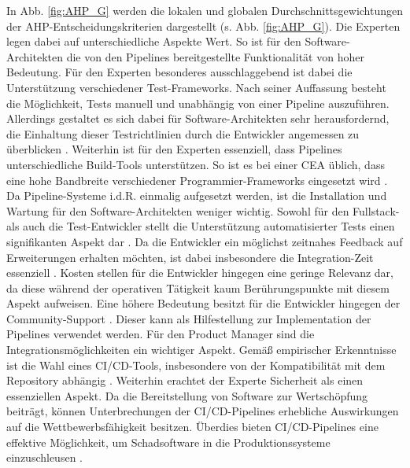 In Abb. \ref*{fig:AHP_G} werden die lokalen und globalen Durchschnittsgewichtungen der AHP-Entscheidungskriterien dargestellt (s. Abb. \ref{fig:AHP_G}). Die Experten legen dabei auf unterschiedliche Aspekte Wert. So ist für den Software-Architekten die von den Pipelines bereitgestellte Funktionalität von hoher Bedeutung. Für den Experten besonderes ausschlaggebend ist dabei die Unterstützung verschiedener Test-Frameworks. Nach seiner Auffassung besteht die Möglichkeit, Tests manuell und unabhängig von einer Pipeline auszuführen. Allerdings gestaltet es sich dabei für Software-Architekten sehr herausfordernd, die Einhaltung dieser Testrichtlinien durch die Entwickler angemessen zu überblicken \cite[Z. 16]{SoftwareArchitektSAPDTSIntegration.}. Weiterhin ist für den Experten essenziell, dass Pipelines unterschiedliche Build-Tools unterstützen. So ist es bei einer CEA üblich, dass eine hohe Bandbreite verschiedener Programmier-Frameworks eingesetzt wird \cite[Z. 11]{SoftwareArchitektSAPDTSIntegration.}. Da Pipeline-Systeme i.d.R. einmalig aufgesetzt werden, ist die Installation und Wartung für den Software-Architekten weniger wichtig. Sowohl für den Fullstack- als auch die Test-Entwickler stellt die Unterstützung automatisierter Tests einen signifikanten Aspekt dar \cite[Z. 4]{BackendTestDeveloperSAPDTSIntegration.}. Da die Entwickler ein möglichst zeitnahes Feedback auf Erweiterungen erhalten möchten, ist dabei insbesondere die Integration-Zeit essenziell \cite[Z. 21]{TestDeveloperSAPHyperspaceAdoption&Onboarding.b}. Kosten stellen für die Entwickler hingegen eine geringe Relevanz dar, da diese während der operativen Tätigkeit kaum Berührungspunkte mit diesem Aspekt aufweisen. Eine höhere Bedeutung besitzt für die Entwickler hingegen der Community-Support \cite[Z. 24]{FullStackEntwicklerSAPDTSIntegration.}. Dieser kann als Hilfestellung zur Implementation der Pipelines verwendet werden. Für den Product Manager sind die Integrationsmöglichkeiten ein wichtiger Aspekt. Gemäß empirischer Erkenntnisse ist die Wahl eines CI/CD-Tools, insbesondere von der Kompatibilität mit dem Repository abhängig \cite[Z. 3]{exp8}. Weiterhin erachtet der Experte Sicherheit als einen essenziellen Aspekt. Da die Bereitstellung von Software zur Wertschöpfung beiträgt, können Unterbrechungen der CI/CD-Pipelines erhebliche Auswirkungen auf die Wettbewerbsfähigkeit besitzen. Überdies bieten CI/CD-Pipelines eine effektive Möglichkeit, um Schadsoftware in die Produktionssysteme einzuschleusen \cite[Z. 6]{exp8}. 

